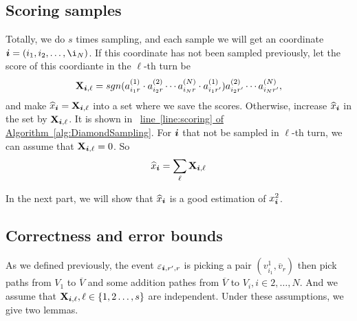 \documentclass{article}
\newcommand{\Sca}[3]{{#1}^{(#2)}_{i_#2#3}}%
\newcommand{\V}[1]{{\bm{{\MakeLowercase{#1}}}}}%
\newcommand{\M}[1]{{\bm{\mathbf{\MakeUppercase{#1}}}}}%
\newcommand{\AlgLine}[2]{\hyperref[alg:#1]{line~\ref*{line:#2} of Algorithm~\ref*{alg:#1}}}
\begin{document}
\subsection{Scoring samples}

Totally, we do $s$ times sampling, and each sample we will get an coordinate $\V{i} = (i_1,i_2,\ldots,\i_N) $. If this coordinate has not been sampled previously, let the score of this coordiante in the $\ell $-th turn be
\[
\M{X}_{\V{i},\ell}  = sgn(\Sca{a}{1}{r}\cdot\Sca{a}{2}{r}\cdots\Sca{a}{N}{r}\cdot\Sca{a}{1}{r'}) \Sca{a}{2}{r'}\cdots\Sca{a}{N}{r'},
\]
and make $\widehat{x}_{\V{i}} = \M{X}_{\V{i},\ell}$ into a set where we save the scores. Otherwise, increase $\widehat{x}_{\V{i}}$ in the set by $\M{X}_{\V{i},\ell}$. It is shown in ~\AlgLine{DiamondSampling}{scoring}. For $\V{i}$ that not be sampled in $\ell$-th turn, we can assume that $\M{X}_{\V{i},\ell}=0$. So
\[
\widehat{x}_{\V{i}} = \sum_{\ell} \M{X}_{\V{i},\ell}
\]

In the next part, we will show that $\widehat{x}_{\V{i}}$ is a good estimation of $x_{\V{i}}^2$.

\subsection{Correctness and error bounds}

As we defined previously, the event $\varepsilon_{\V{i},r',r}$ is picking a pair $(v^1_{i_1},\overline{v}_r)$ then pick paths from $V_1$ to $\overline{V}$ and some addition pathes from $\overline{V}$ to $V_i,i\in{2,\ldots,N}$. And we assume that $\M{X}_{\V{i},\ell},\ell\in\{1,2\ldots,s\}$ are independent. Under these assumptions, we give two lemmas.
\end{document}
